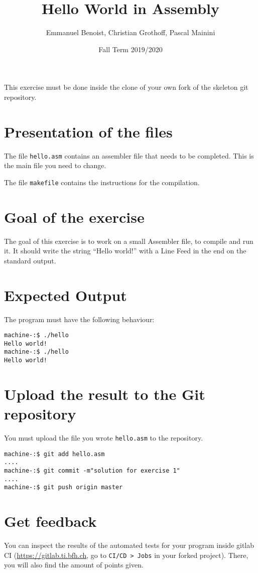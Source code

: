 \documentclass{scrartcl}
\title{Hello World in Assembly}
\author{Emmanuel Benoist, Christian Grothoff, Pascal Mainini}
\date{Fall Term 2019/2020}
\begin{document}
\maketitle

This exercise must be done inside the clone of your own fork of the skeleton git repository.

\section{Presentation of the files}



The file \texttt{hello.asm} contains an assembler file that needs to be completed. This is the main file you need to change.

The file \texttt{makefile} contains the instructions for the compilation. 

\section{Goal of the exercise}

The goal of this exercise is to work on a small Assembler file, to compile and run it. It should write the string ``Hello world!'' with a Line Feed in the end on the standard output.

\section{Expected Output}

The program must have the following behaviour:

\begin{lstlisting}
machine-:$ ./hello
Hello world! 
machine-:$ ./hello
Hello world!
\end{lstlisting}

\section{Upload the result to the Git repository}
You must upload the file you wrote \texttt{hello.asm} to the repository.

\begin{lstlisting}
machine-:$ git add hello.asm
....
machine-:$ git commit -m"solution for exercise 1"
....
machine-:$ git push origin master
\end{lstlisting}%

\section{Get feedback}
You can inspect the results of the automated tests for your program inside gitlab CI (\url{https://gitlab.ti.bfh.ch}, go to \texttt{CI/CD > Jobs} in your forked project). There, you will also find the amount of points given.
\end{document}
